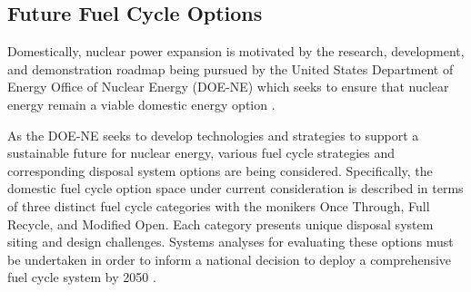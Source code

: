 


\subsection{Future Fuel Cycle Options}

Domestically, nuclear power expansion is motivated by the research, 
development, and demonstration roadmap being pursued by the United 
States Department of Energy Office of Nuclear Energy (DOE-NE) which 
seeks to ensure that nuclear energy remain a viable domestic energy 
option \cite{doe_nuclear_2010}. 

As the DOE-NE seeks to develop technologies and strategies to support 
a sustainable future for nuclear energy, various fuel cycle strategies 
and corresponding disposal system options are being considered.  
Specifically, the domestic fuel cycle option space under current 
consideration is described in terms of three distinct fuel cycle 
categories with the monikers Once Through, Full Recycle, and Modified 
Open. Each category presents unique disposal system siting and design 
challenges. Systems analyses for evaluating these options must be 
undertaken in order to inform a national decision to deploy a 
comprehensive fuel cycle system by 2050 
\cite{doe_nuclear_2010}. 


